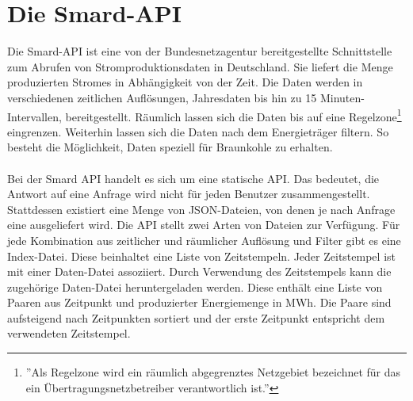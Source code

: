 \section{Die Smard-API}

Die Smard-API\cite{noauthor_bundesapismard-api_nodate} ist eine von der Bundesnetzagentur bereitgestellte Schnittstelle zum Abrufen von Stromproduktionsdaten in Deutschland. Sie liefert die Menge produzierten Stromes in Abhängigkeit von der Zeit. Die Daten werden in verschiedenen zeitlichen Auflösungen, Jahresdaten bis hin zu 15 Minuten-Intervallen, bereitgestellt. Räumlich lassen sich die Daten bis auf eine Regelzone\footnote{''Als Regelzone wird ein räumlich abgegrenztes Netzgebiet bezeichnet für das ein Übertragungsnetzbetreiber verantwortlich ist.''\cite{noauthor_smard_nodate}} eingrenzen. Weiterhin lassen sich die Daten nach dem Energieträger filtern. So besteht die Möglichkeit, Daten speziell für Braunkohle zu erhalten.\\
\\
Bei der Smard API handelt es sich um eine statische API. Das bedeutet, die Antwort auf eine Anfrage wird nicht für jeden Benutzer zusammengestellt. Stattdessen existiert eine Menge von JSON-Dateien, von denen je nach Anfrage eine ausgeliefert wird. Die API stellt zwei Arten von Dateien zur Verfügung. Für jede Kombination aus zeitlicher und räumlicher Auflösung und Filter gibt es eine Index-Datei. Diese beinhaltet eine Liste von Zeitstempeln. Jeder Zeitstempel ist mit einer Daten-Datei assoziiert. Durch Verwendung des Zeitstempels kann die zugehörige Daten-Datei heruntergeladen werden. Diese enthält eine Liste von Paaren aus Zeitpunkt und produzierter Energiemenge in MWh. Die Paare sind aufsteigend nach Zeitpunkten sortiert und der erste Zeitpunkt entspricht dem verwendeten Zeitstempel.